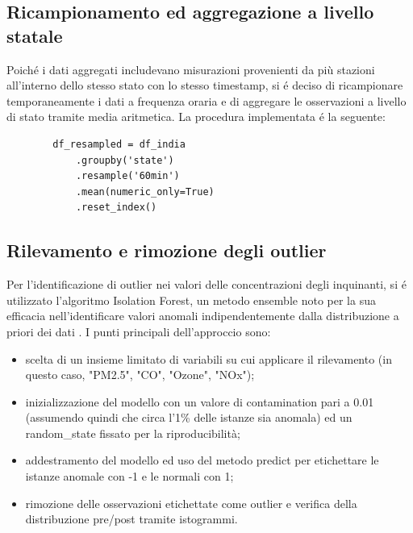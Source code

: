 \documentclass[a4paper,12pt]{report}
\begin{document}
	\subsection{Ricampionamento ed aggregazione a livello statale}
	Poiché i dati aggregati includevano misurazioni provenienti da più stazioni all'interno dello stesso stato con lo stesso timestamp, si é deciso di ricampionare temporaneamente i dati a frequenza oraria e di aggregare le osservazioni a livello di stato tramite media aritmetica. La procedura implementata é la seguente:
	
	\begin{verbatim}
		df_resampled = df_india
			.groupby('state')
			.resample('60min')
			.mean(numeric_only=True)
			.reset_index()
	\end{verbatim}
	
	\subsection{Rilevamento e rimozione degli outlier}
	Per l'identificazione di outlier nei valori delle concentrazioni degli inquinanti, si é utilizzato l'algoritmo Isolation Forest, un metodo ensemble noto per la sua efficacia nell'identificare valori anomali indipendentemente dalla distribuzione a priori dei dati \cite{liu2009iforest}. I punti principali dell'approccio sono:
	
	\begin{itemize}
		\item scelta di un insieme limitato di variabili su cui applicare il rilevamento (in questo caso, "PM2.5", "CO", "Ozone", "NOx");
		\item inizializzazione del modello con un valore di contamination pari a 0.01 (assumendo quindi che circa l'1\% delle istanze sia anomala) ed un random\_state fissato per la riproducibilità;
		\item addestramento del modello ed uso del metodo predict per etichettare le istanze anomale con -1 e le normali con 1;
		\item rimozione delle osservazioni etichettate come outlier e verifica della distribuzione pre/post tramite istogrammi.
	\end{itemize}
	
\end{document}
